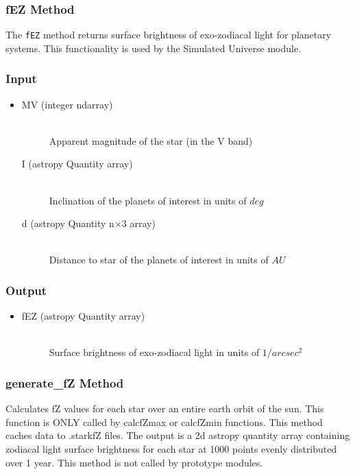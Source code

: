 \documentclass[cleanfoot]{asme2ej}
\begin{document}
\subsubsection{fEZ Method} \label{sec:fEZtask}
The \verb+fEZ+ method returns surface brightness of exo-zodiacal light for planetary systems.  This functionality is used by the Simulated Universe module.

\subsubsection*{Input}
\begin{itemize}
\item 
\begin{description}
    \item[MV (integer ndarray)] \hfill \\ Apparent magnitude of the star (in the V band)
    \item[I (astropy Quantity array)] \hfill \\ Inclination of the planets of interest in units of $ deg $
    \item[d (astropy Quantity n$\times$3 array)] \hfill \\ Distance to star of the planets of interest in units of $AU$
\end{description}
\end{itemize}

\subsubsection*{Output}
\begin{itemize}
\item 
\begin{description}
    \item[fEZ (astropy Quantity array)] \hfill \\ Surface brightness of exo-zodiacal light in units of $ 1/arcsec^2 $
\end{description}
\end{itemize}

\subsubsection{generate\_fZ Method} \label{sec:generatefZtask}
Calculates fZ values for each star over an entire earth orbit of the sun. This function is ONLY called by calcfZmax or calcfZmin functions. This method caches data to .starkfZ files. The output is a 2d astropy quantity array containing zodiacal light surface brightness for each star at 1000 points evenly distributed over 1 year. This method is not called by prototype modules.
\end{document}
